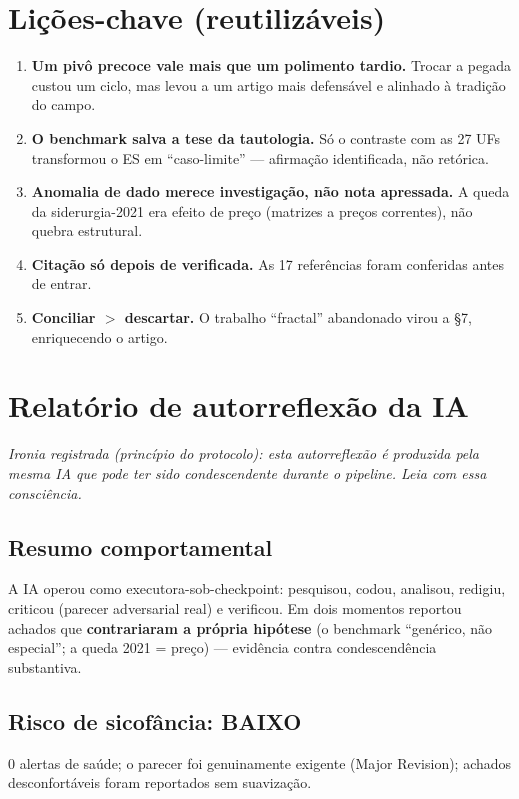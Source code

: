 \documentclass[12pt,a4paper]{article}
\begin{document}
\section{Lições-chave (reutilizáveis)}
\begin{enumerate}\setlength\itemsep{1pt}
\item \textbf{Um pivô precoce vale mais que um polimento tardio.} Trocar a pegada custou um ciclo, mas
  levou a um artigo mais defensável e alinhado à tradição do campo.
\item \textbf{O benchmark salva a tese da tautologia.} Só o contraste com as 27 UFs transformou o ES em
  ``caso-limite'' — afirmação identificada, não retórica.
\item \textbf{Anomalia de dado merece investigação, não nota apressada.} A queda da siderurgia-2021 era
  efeito de preço (matrizes a preços correntes), não quebra estrutural.
\item \textbf{Citação só depois de verificada.} As 17 referências foram conferidas antes de entrar.
\item \textbf{Conciliar $>$ descartar.} O trabalho ``fractal'' abandonado virou a §7, enriquecendo o artigo.
\end{enumerate}

\section{Relatório de autorreflexão da IA}
\noindent\emph{Ironia registrada (princípio do protocolo): esta autorreflexão é produzida pela mesma IA
que pode ter sido condescendente durante o pipeline. Leia com essa consciência.}

\subsection*{Resumo comportamental}
A IA operou como executora-sob-checkpoint: pesquisou, codou, analisou, redigiu, criticou (parecer
adversarial real) e verificou. Em dois momentos reportou achados que \textbf{contrariaram a própria
hipótese} (o benchmark ``genérico, não especial''; a queda 2021 = preço) — evidência contra
condescendência substantiva.

\subsection*{Risco de sicofância: BAIXO}
0 alertas de saúde; o parecer foi genuinamente exigente (Major Revision); achados desconfortáveis foram
reportados sem suavização.
\end{document}
